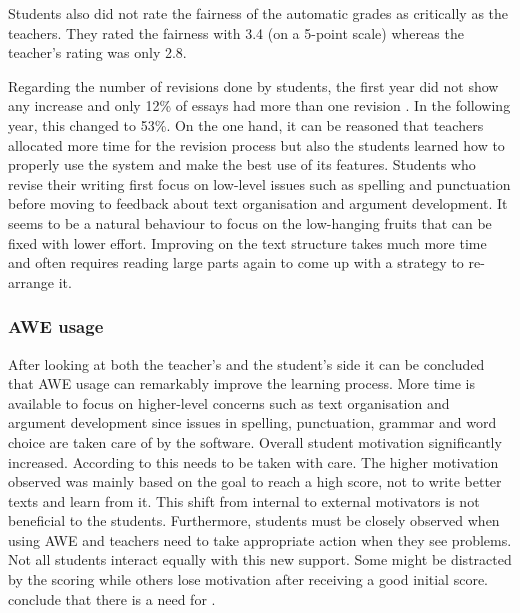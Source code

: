 \documentclass[runningheads]{llncs}
\begin{document}
Students also did not rate the fairness of the automatic grades as critically as the teachers. They rated the fairness with 3.4 (on a 5-point scale) whereas the teacher's rating was only 2.8.

Regarding the number of revisions done by students, the first year did not show any increase and only 12\% of essays had more than one revision \citep{grimes_utility_2010}. In the following year, this changed to 53\%. On the one hand, it can be reasoned that teachers allocated more time for the revision process but also the students learned how to properly use the system and make the best use of its features. Students who revise their writing first focus on low-level issues such as spelling and punctuation before moving to feedback about text organisation and argument development. It seems to be a natural behaviour to focus on the low-hanging fruits that can be fixed with lower effort. Improving on the text structure takes much more time and often requires reading large parts again to come up with a strategy to re-arrange it.

\subsubsection{AWE usage} After looking at both the teacher's and the student's side it can be concluded that AWE usage can remarkably improve the learning process. More time is available to focus on higher-level concerns such as text organisation and argument development since issues in spelling, punctuation, grammar and word choice are taken care of by the software. Overall student motivation significantly increased. According to \textcite{grimes_utility_2010} this needs to be taken with care. The higher motivation observed was mainly based on the goal to reach a high score, not to write better texts and learn from it. This shift from internal to external motivators is not beneficial to the students. Furthermore, students must be closely observed when using AWE and teachers need to take appropriate action when they see problems. Not all students interact equally with this new support. Some might be distracted by the scoring while others lose motivation after receiving a good initial score. \citeauthor{grimes_utility_2010} conclude that there is a need for .
\end{document}
